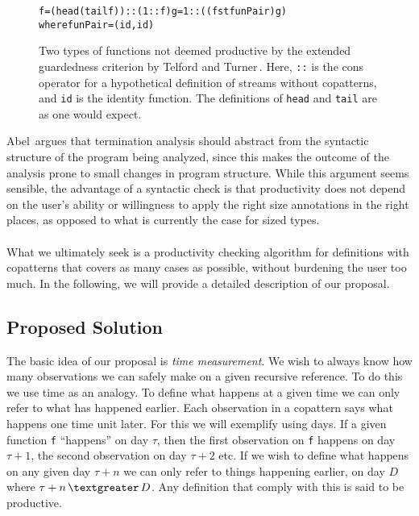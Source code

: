\begin{figure}
\begin{alltt}
f = (head (tail f)) :: (1 :: f)                 g = 1 :: ((fst funPair) g)
                                                where funPair = (id, id)
\end{alltt}
\caption{Two types of functions not deemed productive by the extended guardedness criterion by Telford and Turner\,\citep[Section6.3]{Telford98ensuringthe}. Here, \texttt{::} is the cons operator for a hypothetical definition of streams without copatterns, and \texttt{id} is the identity function. The definitions of \texttt{head} and \texttt{tail} are as one would expect.} 
\label{fig:TelfordTurnerProblems}
\end{figure}

Abel\,\citep{Abel99terminationchecking} argues that termination analysis should abstract from the syntactic structure of the program being analyzed, since this makes the outcome of the analysis prone to small changes in program structure. While this argument seems sensible, the advantage of a syntactic check is that productivity does not depend on the user's ability or willingness to apply the right size annotations in the right places, as opposed to what is currently the case for sized types.

\paragraph{}
What we ultimately seek is a productivity checking algorithm for definitions with copatterns that covers as many cases as possible, without burdening the user too much. In the following, we will provide a detailed description of our proposal.
\subsection{Proposed Solution}
The basic idea of our proposal is \textit{time measurement}. We wish to always know how many observations we can safely make on a given recursive reference. To do this we use time as an analogy. To define what happens at a given time we can only refer to what has happened earlier. Each observation in a copattern says what happens one time unit later. For this we will exemplify using days. If a given function \texttt{f} ``happens'' on day $\tau$, then the first observation on \texttt{f} happens on day $\tau+1$, the second observation on day $\tau+2$ etc. If we wish to define what happens on any given day $\tau+n$ we can only refer to things happening earlier, on day $D$ where $\tau+n\, \textgreater \,D$. Any definition that comply with this is said to be productive.

